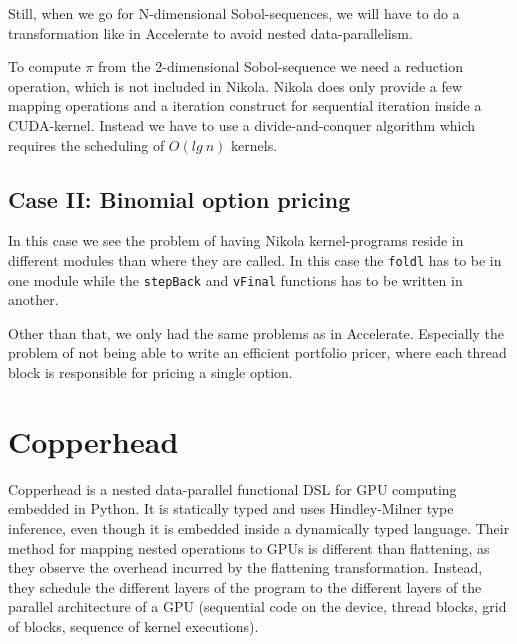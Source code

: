 \documentclass[preprint]{sigplanconf}
\begin{document}
Still, when we go for N-dimensional Sobol-sequences, we will have to
do a transformation like in Accelerate to avoid nested
data-parallelism.

To compute $\pi$ from the 2-dimensional Sobol-sequence we need
a reduction operation, which is not included in Nikola. Nikola does
only provide a few mapping operations and a iteration construct for
sequential iteration inside a CUDA-kernel. Instead we have to use a
divide-and-conquer algorithm which requires the scheduling of
$O(lg~n)$ kernels.

\subsection{Case II: Binomial option pricing}
In this case we see the problem of having Nikola kernel-programs
reside in different modules than where they are called. In this case
the \verb|foldl| has to be in one module while the \verb|stepBack| and
\verb|vFinal| functions has to be written in another.

Other than that, we only had the same problems as in
Accelerate. Especially the problem of not being able to write an
efficient portfolio pricer, where each thread block is responsible for
pricing a single option.


\section{Copperhead}
Copperhead is a nested data-parallel functional DSL for GPU computing
embedded in Python. It is statically typed and uses Hindley-Milner
type inference, even though it is embedded inside a dynamically typed
language. Their method for mapping nested operations to GPUs is
different than flattening, as they observe the overhead incurred by
the flattening transformation. Instead, they schedule the different
layers of the program to the different layers of the parallel
architecture of a GPU (sequential code on the device, thread blocks,
grid of blocks, sequence of kernel executions).
\end{document}
